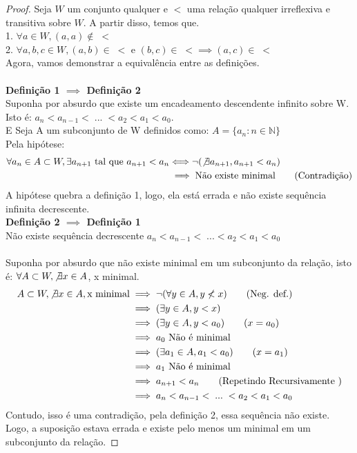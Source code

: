\begin{proof}
    Seja $W$ um conjunto qualquer e $<$ uma relação qualquer irreflexiva e transitiva sobre $W$. A partir disso, temos que.\\
    1. $\forall a\in W, (a,a) \not\in \; <$ \\
    2. $\forall a, b,c \in W, (a,b)\in  \; <$ e $(b,c) \in \; < \implies (a,c) \in \;<$ \\
    Agora, vamos demonstrar a equivalência entre as definições. \\
    \\
    \textbf{Definição 1 $\implies$ Definição 2}\\
    Suponha por absurdo que existe um encadeamento descendente infinito sobre W. Isto é:
    $a_n < a_{n-1} < \; ... \; < a_2<a_1<a_0$. 
    \\ E Seja A um subconjunto de W definidos como: $A = \{a_n:n\in \mathbb{N}\}$   \\
    Pela hipótese: 
    \begin{align}
        \forall a_n \in A \subset W, \exists a_{n+1} \text{ tal que } a_{n+1} < a_n
        &\Longleftrightarrow \neg(\not\exists a_{n+1} , a_{n+1} < a_n) \\
        &\implies \text{Não existe minimal} \tag{Contradição}
    \end{align}
    A hipótese quebra a definição 1, logo, ela está errada e não existe sequência infinita decrescente. 
    \\
    \textbf{Definição 2 $\implies$ Definição 1}
    \\
    Não existe sequência decrescente $a_n < a_{n-1} < \; ... < a_2<a_1<a_0$ \\
    \\
    Suponha por absurdo que não existe minimal em um subconjunto da relação, isto é: $\forall A\subset  W, \not\exists x \in A$, x minimal.
    \begin{align}
        A\subset  W, \not\exists x \in A, \text{x minimal} 
        &\implies \neg(\forall y \in A, y \not< x) \tag{Neg. def.} \\
        &\implies (\exists y \in A, y<x) \\
        &\implies (\exists y \in A, y<a_0) \tag{$x = a_0$} \\ 
        &\implies a_0 \text{ Não é minimal} \\
        &\implies (\exists a_1 \in A, a_1<a_0) \tag{$x = a_1$} \\
        &\implies a_1 \text{ Não é minimal} \\
        &\implies a_{n+1}<a_n \tag{Repetindo Recursivamente } \\
        &\implies a_n<a_{n-1}< \; ... \; < a_2 <a_1 <a_0
    \end{align}
    Contudo, isso é uma contradição, pela definição 2, essa sequência não existe. \\
    Logo, a suposição estava errada e existe pelo menos um minimal em um subconjunto da relação. 
\end{proof}

